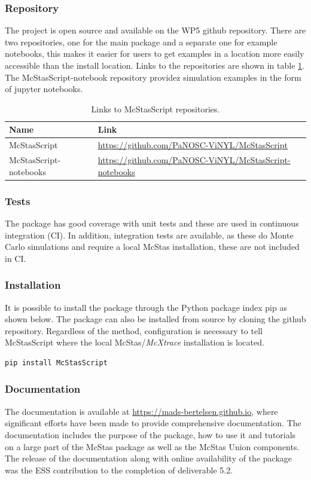 \documentclass[11pt, a4paper]{article}
\begin{document}
\subsubsection{Repository}
The project is open source and available on the WP5 github repository. There are
two repositories, one for the main package and a separate one for example
notebooks, this makes it easier for users to get examples in a location more
easily accessible than the install location. Links to the repositories are shown
in table \ref{tab:links}. The McStasScript-notebook repository providez
simulation examples in the form of jupyter notebooks.

\begin{table}[h!!!]
\centering
\begin{tabular}{l|l}
Name & Link \\\hline
McStasScript & \href{https://github.com/PaNOSC-ViNYL/McStasScript}{https://github.com/PaNOSC-ViNYL/McStasScript} \\
McStasScript-notebooks &  \href{https://github.com/PaNOSC-ViNYL/McStasScript-notebooks}{https://github.com/PaNOSC-ViNYL/McStasScript-notebooks}
\end{tabular}
\caption{\label{tab:links} Links to McStasScript repositories.}
\end{table}

\subsubsection{Tests}
The package has good coverage with unit tests and these are used in continuous integration (CI). In addition, integration tests are available, as these do Monte Carlo simulations and require a local McStas installation, these are not included in CI.

\subsubsection{Installation}
It is possible to install the package through the Python package index pip as shown below. The package can also be installed from source by cloning the github repository. Regardless of the method, configuration is necessary to tell McStasScript where the local McStas/\textit{McXtrace} installation is located.

\begin{lstlisting}[language=Python]
pip install McStasScript
\end{lstlisting}

\subsubsection{Documentation}
The documentation is available at \href{https://mads-bertelsen.github.io}{https://mads-bertelsen.github.io}, where significant efforts have been made to provide comprehensive documentation. The documentation includes the purpose of the package, how to use it and tutorials on a large part of the McStas package as well as the McStas Union components. The release of the documentation along with online availability of the package was the ESS contribution to the completion of deliverable 5.2.
\end{document}
